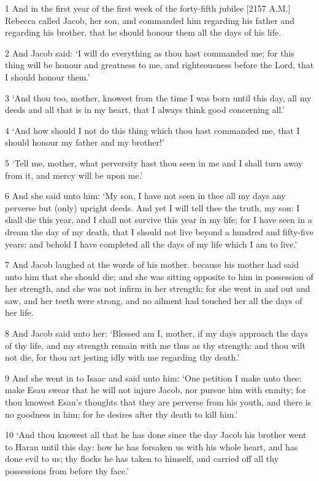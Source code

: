 \par 1 And in the first year of the first week of the forty-fifth jubilee [2157 A.M.] Rebecca called Jacob, her son, and commanded him regarding his father and regarding his brother, that he should honour them all the days of his life.
\par 2 And Jacob said: ‘I will do everything as thou hast commanded me; for this thing will be honour and greatness to me, and righteousness before the Lord, that I should honour them.’
\par 3 ‘And thou too, mother, knowest from the time I was born until this day, all my deeds and all that is in my heart, that I always think good concerning all.’
\par 4 ‘And how should I not do this thing which thou hast commanded me, that I should honour my father and my brother!’
\par 5 ‘Tell me, mother, what perversity hast thou seen in me and I shall turn away from it, and mercy will be upon me.’
\par 6 And she said unto him: ‘My son, I have not seen in thee all my days any perverse but (only) upright deeds. And yet I will tell thee the truth, my son: I shall die this year, and I shall not survive this year in my life; for I have seen in a dream the day of my death, that I should not live beyond a hundred and fifty-five years: and behold I have completed all the days of my life which I am to live.’
\par 7 And Jacob laughed at the words of his mother. because his mother had said unto him that she should die; and she was sitting opposite to him in possession of her strength, and she was not infirm in her strength; for she went in and out and saw, and her teeth were strong, and no ailment had touched her all the days of her life.
\par 8 And Jacob said unto her: ‘Blessed am I, mother, if my days approach the days of thy life, and my strength remain with me thus as thy strength: and thou wilt not die, for thou art jesting idly with me regarding thy death.’
\par 9 And she went in to Isaac and said unto him: ‘One petition I make unto thee: make Esau swear that he will not injure Jacob, nor pursue him with enmity; for thou knowest Esau's thoughts that they are perverse from his youth, and there is no goodness in him; for he desires after thy death to kill him.’
\par 10 ‘And thou knowest all that he has done since the day Jacob his brother went to Haran until this day: how he has forsaken us with his whole heart, and has done evil to us; thy flocks he has taken to himself, and carried off all thy possessions from before thy face.’
